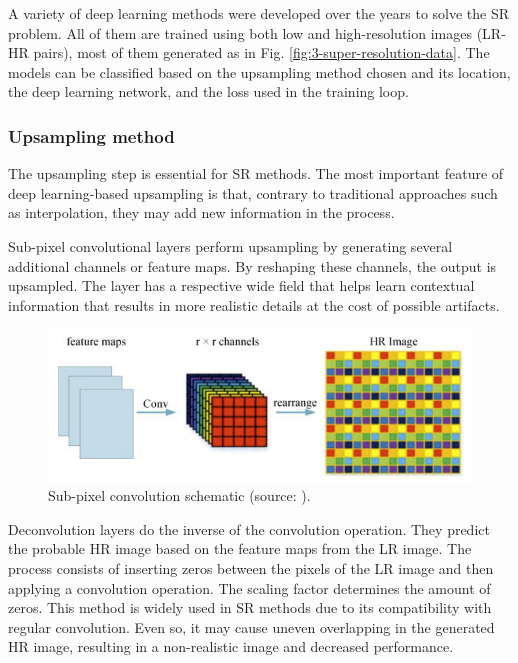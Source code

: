         A variety of deep learning methods were developed over the years to solve the SR problem. All of them are trained using both low and high-resolution images (LR-HR pairs), most of them generated as in Fig. \ref{fig:3-super-resolution-data}. The models can be classified based on the upsampling method chosen and its location, the deep learning network, and the loss used in the training loop.


        \subsubsection{Upsampling method}

        The upsampling step is essential for SR methods. The most important feature of deep learning-based upsampling is that, contrary to traditional approaches such as interpolation, they may add new information in the process.

        Sub-pixel convolutional layers perform upsampling by generating several additional channels or feature maps. By reshaping these channels, the output is upsampled. The layer has a respective wide field that helps learn contextual information that results in more realistic details at the cost of possible artifacts.
        
        \begin{figure}[H]
            \centering
            \includegraphics[width=\textwidth]{Includes/2-sub-pixel-convolution.png}
            \caption{Sub-pixel convolution schematic (source: \cite{Liu2019}).}
            \label{fig:2-sub-pixel-convolution}
        \end{figure}


        

        Deconvolution layers do the inverse of the convolution operation. 
        They predict the probable HR image based on the feature maps from the LR image. The process consists of inserting zeros between the pixels of the LR image and then applying a convolution operation. The scaling factor determines the amount of zeros. This method is widely used in SR methods due to its compatibility with regular convolution. Even so, it may cause uneven overlapping in the generated HR image, resulting in a non-realistic image and decreased performance.

